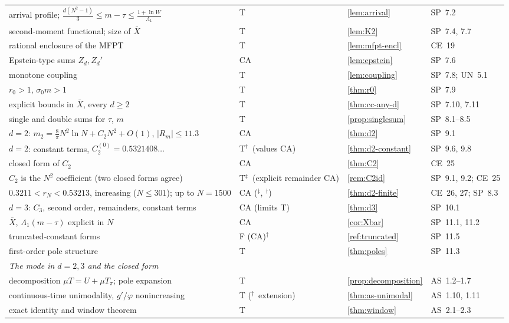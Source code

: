 \documentclass[10pt,a4paper]{article}
\theoremstyle{plain}
\theoremstyle{definition}
\newcommand{\NEW}{\ensuremath{^{\dagger}}}       %
\newcommand{\SYN}{\ensuremath{^{\ddagger}}}      %
\newcommand{\SPE}{\textsf{SP}}
\newcommand{\ASY}{\textsf{AS}}
\newcommand{\UNI}{\textsf{UN}}
\newcommand{\CER}{\textsf{CE}}
\newcommand{\Xb}{\bar X}
\begin{document}
{\begin{longtable}{p{}p{}p{}p{}}
arrival profile; $\frac{d(N^2-1)}3\le m-\tau\le\frac{1+\ln W}{\Lambda_1}$ & T & \ref{lem:arrival} & \SPE\ 7.2\\
second-moment functional; size of $\Xb$ & T & \ref{lem:K2} & \SPE\ 7.4, 7.7\\
rational enclosure of the MFPT & T & \ref{lem:mfpt-encl} & \CER\ 19\\
Epstein-type sums $Z_d,Z_d'$ & CA & \ref{lem:epstein} & \SPE\ 7.6\\
monotone coupling & T & \ref{lem:coupling} & \SPE\ 7.8; \UNI\ 5.1\\
$r_0>1$, $\sigma_0m>1$ & T & \ref{thm:r0} & \SPE\ 7.9\\
explicit bounds in $\Xb$, every $d\ge2$ & T & \ref{thm:cc-any-d} & \SPE\ 7.10, 7.11\\
single and double sums for $\tau$, $m$ & T & \ref{prop:singlesum} & \SPE\ 8.1--8.5\\
$d=2$: $m_2=\frac8\pi N^2\ln N+C_2N^2+O(1)$, $|R_m|\le11.3$ & CA & \ref{thm:d2} & \SPE\ 9.1\\
$d=2$: constant terms, $C_2^{(0)}=0.5321408\ldots$ & T\NEW\ (values CA) & \ref{thm:d2-constant} & \SPE\ 9.6, 9.8\\
closed form of $C_2$ & CA & \ref{thm:C2} & \CER\ 25\\
$C_2$ is the $N^2$ coefficient (two closed forms agree) & T\SYN\ (explicit remainder CA) & \ref{rem:C2id} & \SPE\ 9.1, 9.2; \CER\ 25\\
$0.3211<r_N<0.53213$, increasing ($N\le301$); up to $N=1500$ & CA (\SYN, \NEW) & \ref{thm:d2-finite} & \CER\ 26, 27; \SPE\ 8.3\\
$d=3$: $C_3$, second order, remainders, constant terms & CA (limits T) & \ref{thm:d3} & \SPE\ 10.1\\
$\Xb$, $\Lambda_1(m-\tau)$ explicit in $N$ & CA & \ref{cor:Xbar} & \SPE\ 11.1, 11.2\\
truncated-constant forms & F (CA)\NEW & \ref{ref:truncated} & \SPE\ 11.5\\
first-order pole structure & T & \ref{thm:poles} & \SPE\ 11.3\\
\midrule
\multicolumn{4}{l}{\emph{The mode in $d=2,3$ and the closed form}}\\
decomposition $\mu T=U+\mu T_\pi$; pole expansion & T & \ref{prop:decomposition} & \ASY\ 1.2--1.7\\
continuous-time unimodality, $g'/\varphi$ nonincreasing & T (\NEW\ extension) & \ref{thm:as-unimodal} & \ASY\ 1.10, 1.11\\
exact identity and window theorem & T & \ref{thm:window} & \ASY\ 2.1--2.3\\

\end{longtable}}
\end{document}
